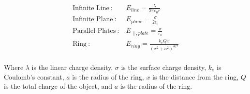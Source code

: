 \begin{align*}
    \text{Infinite Line}\ :\ &E_{line} = \frac{\lambda}{2\pi\epsilon_0 r}\\
    \text{Infinite Plane}\ :\ &E_{plane} = \frac{\sigma}{2\epsilon_0}\\
    \text{Parallel Plates}\ :\ &E_{\parallel,plate} = \frac{\sigma}{\epsilon_0}\\
    \text{Ring}\ :\ &E_{ring} = \frac{k_eQx}{(x^2 + a^2)^{3/2}}\\
\end{align*}

Where $\lambda$ is the linear charge density, $\sigma$ is the surface charge density, $k_e$ is Coulomb's constant, $a$ is the radius of the ring, 
$x$ is the distance from the ring, $Q$ is the total charge of the object, and $a$ is the radius of the ring.